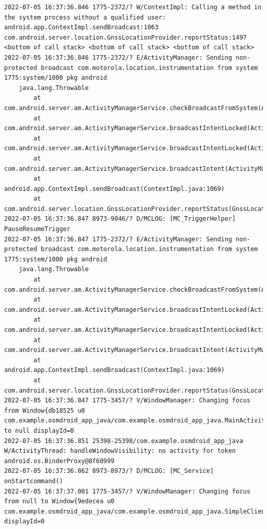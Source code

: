\documentclass[a4paper,12pt]{book}
\begin{document}
\begin{lstlisting}
2022-07-05 16:37:36.846 1775-2372/? W/ContextImpl: Calling a method in the system process without a qualified user: android.app.ContextImpl.sendBroadcast:1063 com.android.server.location.GnssLocationProvider.reportStatus:1497 <bottom of call stack> <bottom of call stack> <bottom of call stack> 
2022-07-05 16:37:36.846 1775-2372/? E/ActivityManager: Sending non-protected broadcast com.motorola.location.instrumentation from system 1775:system/1000 pkg android
    java.lang.Throwable
        at com.android.server.am.ActivityManagerService.checkBroadcastFromSystem(ActivityManagerService.java:15425)
        at com.android.server.am.ActivityManagerService.broadcastIntentLocked(ActivityManagerService.java:15979)
        at com.android.server.am.ActivityManagerService.broadcastIntentLocked(ActivityManagerService.java:15442)
        at com.android.server.am.ActivityManagerService.broadcastIntent(ActivityManagerService.java:16227)
        at android.app.ContextImpl.sendBroadcast(ContextImpl.java:1069)
        at com.android.server.location.GnssLocationProvider.reportStatus(GnssLocationProvider.java:1497)
2022-07-05 16:37:36.847 8973-9046/? D/MCLOG: [MC_TriggerHelper] PauseResumeTrigger
2022-07-05 16:37:36.847 1775-2372/? E/ActivityManager: Sending non-protected broadcast com.motorola.location.instrumentation from system 1775:system/1000 pkg android
    java.lang.Throwable
        at com.android.server.am.ActivityManagerService.checkBroadcastFromSystem(ActivityManagerService.java:15425)
        at com.android.server.am.ActivityManagerService.broadcastIntentLocked(ActivityManagerService.java:16073)
        at com.android.server.am.ActivityManagerService.broadcastIntentLocked(ActivityManagerService.java:15442)
        at com.android.server.am.ActivityManagerService.broadcastIntent(ActivityManagerService.java:16227)
        at android.app.ContextImpl.sendBroadcast(ContextImpl.java:1069)
        at com.android.server.location.GnssLocationProvider.reportStatus(GnssLocationProvider.java:1497)
2022-07-05 16:37:36.847 1775-3457/? V/WindowManager: Changing focus from Window{db18525 u0 com.example.osmdroid_app_java/com.example.osmdroid_app_java.MainActivity} to null displayId=0
2022-07-05 16:37:36.851 25398-25398/com.example.osmdroid_app_java W/ActivityThread: handleWindowVisibility: no activity for token android.os.BinderProxy@8f60999
2022-07-05 16:37:36.862 8973-8973/? D/MCLOG: [MC_Service] onStartcommand()
2022-07-05 16:37:37.001 1775-3457/? V/WindowManager: Changing focus from null to Window{9edecea u0 com.example.osmdroid_app_java/com.example.osmdroid_app_java.SimpleClient} displayId=0

\end{lstlisting}
\end{document}
